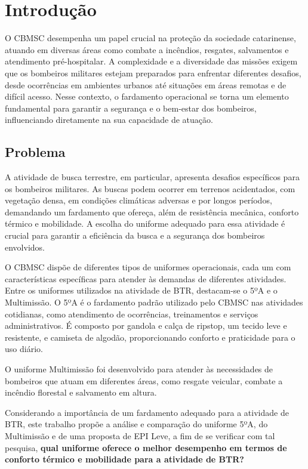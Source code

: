 \chapter{Introdução}



O \acrfull{CBMSC}
desempenha um papel crucial na proteção da sociedade catarinense, atuando em diversas áreas como combate a incêndios, resgates, salvamentos e atendimento pré-hospitalar. A complexidade e a diversidade das missões exigem que os bombeiros militares estejam preparados para enfrentar diferentes desafios, desde ocorrências em ambientes urbanos até situações em áreas remotas e de difícil acesso.  Nesse contexto, o fardamento operacional se torna um elemento fundamental para garantir a segurança e o bem-estar dos bombeiros, influenciando diretamente na sua capacidade de atuação.

\section{Problema}

	A atividade de busca terrestre, em particular, apresenta desafios específicos para os bombeiros militares.
	 As buscas podem ocorrer em terrenos acidentados, com vegetação densa, em condições climáticas adversas e por longos períodos,
	  demandando um fardamento que ofereça, além de resistência mecânica, conforto térmico e mobilidade.  
	  A escolha do uniforme adequado para essa atividade é crucial para garantir a eficiência da busca e a segurança dos bombeiros envolvidos.

	 O \acrshort{CBMSC} dispõe de diferentes tipos de uniformes operacionais, cada um com características específicas para atender
	 às demandas de diferentes atividades.  Entre os uniformes utilizados na atividade de \acrfull{BTR}, destacam-se o 5ºA e o Multimissão.
	  O 5ºA é o fardamento padrão utilizado pelo \acrshort{CBMSC} nas atividades cotidianas, como atendimento de ocorrências,
	   treinamentos e serviços administrativos. É composto por gandola e calça de ripstop, um tecido leve e resistente, e camiseta de algodão,
	    proporcionando conforto e praticidade para o uso diário.

	\tab O uniforme Multimissão foi desenvolvido para atender às necessidades de bombeiros que atuam em diferentes áreas, como resgate veicular,
	 combate a incêndio florestal e salvamento em altura.

	\tab Considerando a importância de um fardamento adequado para a atividade de \acrshort{BTR}, este trabalho propõe a análise e comparação do
	 uniforme 5ºA, do Multimissão e de uma proposta de EPI Leve, a fim de se verificar com tal pesquisa, \textbf{qual uniforme oferece o melhor desempenho 
	 em termos de conforto térmico e mobilidade para a atividade de \acrlong{BTR}?}

